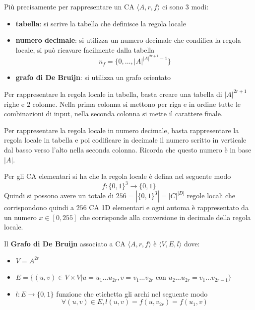 Più precisamente per rappresentare un CA  $\langle A, r, f\rangle$ ci sono 3 modi:
\begin{itemize}
    \item \textbf{tabella}: si scrive la tabella che definisce la regola locale
    \item \textbf{numero decimale}: si utilizza un numero decimale che condifica
          la regola locale, si può ricavare facilmente dalla tabella
          $$n_f = \{0,\dots, |A|^{|A|^{2r+1}-1}\}$$
    \item \textbf{grafo di De Bruijn}: si utilizza un grafo orientato
\end{itemize}


\begin{esempio} 
    Per rappresentare la regola locale in tabella, basta creare una tabella di
    $|A|^{2r+1}$ righe e $2$ colonne. Nella prima colonna si mettono per riga e in ordine
    tutte le combinazioni di input, nella seconda colonna si mette il carattere
    finale.
\end{esempio}

\begin{esempio} 
    Per rappresentare la regola locale in numero decimale, basta rappresentare
    la regola locale in tabella e poi codificare in decimale il numero scritto in
    verticale dal basso verso l'alto nella seconda colonna. Ricorda che questo numero
    è in base $|A|$.
\end{esempio}

\begin{nota}
    Per gli CA elementari si ha che la regola locale è defina nel seguente modo
    $$f:\{0,1\}^3\rightarrow \{0,1\}$$
    Quindi si possono avere un totale di $256 = |\{0,1\}^3|
        = |C|^{|D|}$ regole locali che
    corrispondono quindi a $256$ CA 1D elementari e ogni automa è rappresentato da un
    numero $x\in [0, 255]$ che corrisponde alla conversione in decimale della regola
    locale.
\end{nota}

\begin{definizione} 
    Il \textbf{Grafo di De Bruijn} associato a CA $\langle A, r, f\rangle$ è $\langle V,E,l\rangle$
    dove:
    \begin{itemize}
        \item $V=A^{2r}$
        \item $E = \{(u,v)\in V\times V | u=u_1\dots u_{2r},  v=v_1\dots v_{2r} \text{ con } u_2\dots u_{2r} = v_1\dots v_{2r-1}\}$
        \item $l:E\rightarrow \{0,1\}$ funzione che etichetta gli archi nel seguente
              modo $$\forall (u,v)\in E, l(u,v) = f(u,v_{2r})=f(u_1,v)$$
    \end{itemize}
\end{definizione}

